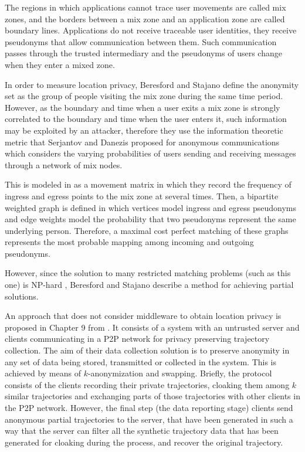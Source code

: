 \documentclass{llncs}
\begin{document}
The regions in which applications cannot trace user movements are called mix zones, and the borders between a mix zone and an application zone are called boundary lines.
Applications do not receive traceable user identities, they receive pseudonyms that allow communication between them. Such communication passes through the trusted intermediary and the pseudonyms of users change when they enter a mixed zone.


In order to measure location privacy, Beresford and Stajano \cite{Beresford04mixzones} define the anonymity set as the group of people visiting the mix zone during the same time period. However, as the boundary and time when a user exits a mix zone is strongly correlated to the boundary and time when the user enters it, such information may be exploited by an attacker, therefore they use the information theoretic metric that Serjantov and Danezis \cite{Serjantov2002} proposed for anonymous communications which considers the varying probabilities of users sending and receiving messages through a network of mix nodes.


This is modeled in \cite{Beresford04mixzones} as a movement matrix in which they record the frequency of ingress and egress points to the mix zone at several times.
Then, a bipartite weighted graph is defined in which vertices model ingress and egress pseudonyms and edge weights
model the probability that two pseudonyms represent the same underlying person. Therefore, a maximal cost perfect matching of these graphs represents the most probable mapping among incoming and outgoing pseudonyms.

However, since the solution to many restricted matching problems (such as this one) is NP-hard \cite{Tanimoto1978}, Beresford and Stajano \cite{Beresford04mixzones} describe a method for achieving partial solutions.


An approach that does not consider middleware to obtain location privacy is proposed in Chapter 9 from \cite{Gidofalvi2007}. It consists of a system with an untrusted server and clients communicating in a P2P network for privacy preserving trajectory collection.
The aim of their data collection solution is to preserve anonymity in any set of data being stored, transmitted or
collected in the system. This is achieved by means of $k$-anonymization and swapping.
Briefly, the protocol consists of the clients recording their private trajectories, cloaking them among $k$ similar trajectories and exchanging parts of those trajectories with other clients in the P2P network. However, the final step (the data reporting stage) clients send anonymous partial trajectories to the server, that have been generated in such a way that the server can filter all the synthetic trajectory data that has been generated for cloaking during the process, and recover the original trajectory.
\end{document}
